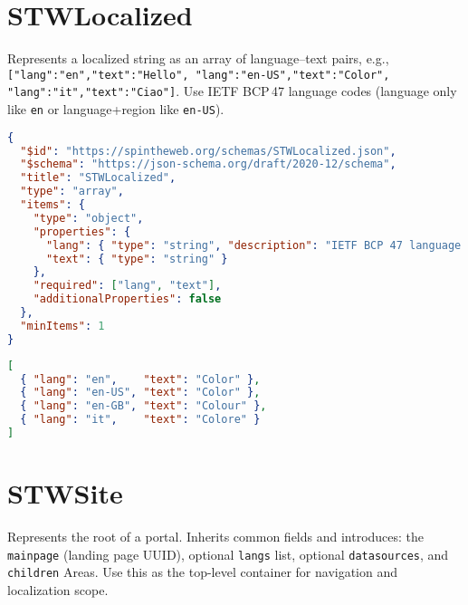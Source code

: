 \section{STWLocalized}
Represents a localized string as an array of language–text pairs, e.g., \texttt{[{"lang":"en","text":"Hello"}, {"lang":"en-US","text":"Color"}, {"lang":"it","text":"Ciao"}]}. Use IETF BCP\,47 language codes (language only like \texttt{en} or language+region like \texttt{en-US}).
\begin{lstlisting}[language=JSON,caption={STWLocalized Schema Definition}]
{
  "$id": "https://spintheweb.org/schemas/STWLocalized.json",
  "$schema": "https://json-schema.org/draft/2020-12/schema",
  "title": "STWLocalized",
  "type": "array",
  "items": {
    "type": "object",
    "properties": {
      "lang": { "type": "string", "description": "IETF BCP 47 language tag (e.g., 'en', 'en-US')" },
      "text": { "type": "string" }
    },
    "required": ["lang", "text"],
    "additionalProperties": false
  },
  "minItems": 1
}
\end{lstlisting}

\begin{lstlisting}[language=JSON,caption={STWLocalized Examples (language and region-qualified tags)}]
[
  { "lang": "en",    "text": "Color" },
  { "lang": "en-US", "text": "Color" },
  { "lang": "en-GB", "text": "Colour" },
  { "lang": "it",    "text": "Colore" }
]
\end{lstlisting}

\section{STWSite}
Represents the root of a portal. Inherits common fields and introduces: the \texttt{mainpage} (landing page UUID), optional \texttt{langs} list, optional \texttt{datasources}, and \texttt{children} Areas. Use this as the top-level container for navigation and localization scope.
